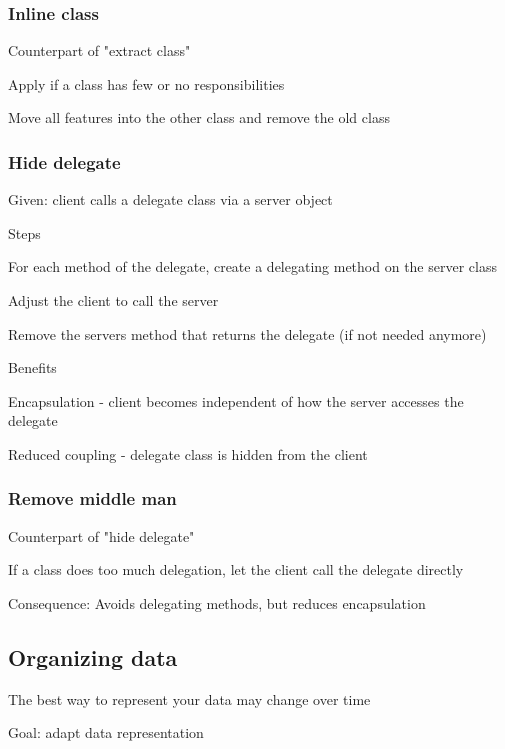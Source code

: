 \subsubsection{Inline class}
\enumstart
	\item Counterpart of "extract class"
	\item Apply if a class has few or no responsibilities
	\item Move all features into the other class and remove the old class
\enumend
	
\subsubsection{Hide delegate}
\enumstart
	\item Given: client calls a delegate class via a server object
	\item Steps
	\enumstart
		\item For each method of the delegate, create a delegating method on the server class
		\item Adjust the client to call the server
		\item Remove the servers method that returns the delegate (if not needed anymore)
	\enumend
	\item Benefits
	\enumstart
		\item Encapsulation - client becomes independent of how the server accesses the delegate
		\item Reduced coupling - delegate class is hidden from the client
	\enumend
\enumend

\subsubsection{Remove middle man}
\enumstart
	\item Counterpart of "hide delegate"
	\item If a class does too much delegation, let the client call the delegate directly
	\item Consequence: Avoids delegating methods, but reduces encapsulation
\enumend

\subsection{Organizing data}
\enumstart
	\item The best way to represent your data may change over time
	\item Goal: adapt data representation
\enumend

